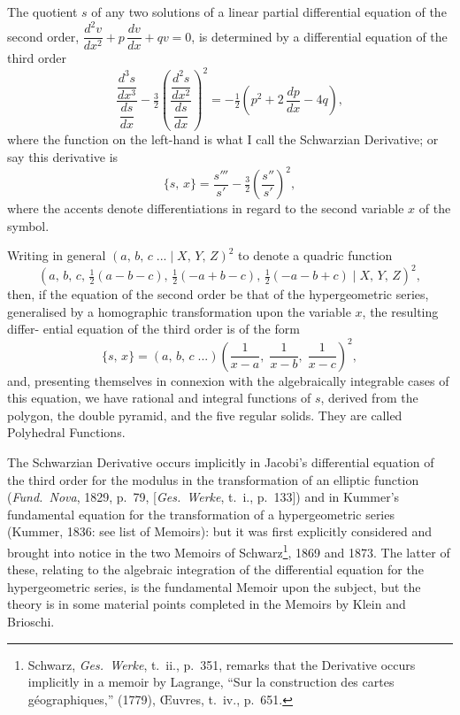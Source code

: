 \documentclass[11pt]{article}
\begin{document}
\bigskip

The quotient $s$ of any two solutions of a linear partial differential equation of
the second order, $\dfrac{d^2 v}{dx^2} + p\,\dfrac{dv}{dx} + qv = 0$, is determined by a differential equation of the
third order
\[
   \frac{\dfrac{d^3 s}{dx^3}}{\dfrac{ds}{dx}} - \tfrac{3}{2}\left(\frac{\dfrac{d^2 s}{dx^2}}{\dfrac{ds}{dx}}\right)^2
   = -\tfrac{1}{2}\!\left(p^2 + 2\,\frac{dp}{dx} - 4q\right),
\]
where the function on the left-hand is what I call the Schwarzian Derivative; or
say this derivative is
\[
   \{s,\, x\} = \frac{s'''}{s'} - \tfrac{3}{2}\!\left(\frac{s''}{s'}\right)^2,
\]
where the accents denote differentiations in regard to the second variable $x$ of the
symbol.

Writing in general $(a,\, b,\, c\;.{}.\!. \mid X,\, Y,\, Z)^2$ to denote a quadric function
\[
   (a,\, b,\, c,\, \tfrac{1}{2}(a - b - c),\, \tfrac{1}{2}(-a + b - c),\, \tfrac{1}{2}(-a - b + c) \mid X,\, Y,\, Z)^2,
\]
then, if the equation of the second order be that of the hypergeometric series,
generalised by a homographic transformation upon the variable $x$, the resulting differ-
ential equation of the third order is of the form
\[
   \{s,\, x\} = (a,\, b,\, c\;.{}.\!.) \left(\frac{1}{x - a},\; \frac{1}{x - b},\; \frac{1}{x - c}\right)^{\!2}\!,
\]
and, presenting themselves in connexion with the algebraically integrable cases of this
equation, we have rational and integral functions of $s$, derived from the polygon, the
double pyramid, and the five regular solids. They are called Polyhedral Functions.

The Schwarzian Derivative occurs implicitly in Jacobi's differential equation of the
third order for the modulus in the transformation of an elliptic function (\textit{Fund.\ Nova},
1829, p.\ 79, [\textit{Ges.\ Werke}, t.\ i., p.\ 133]) and in Kummer's fundamental equation for the
transformation of a hypergeometric series (Kummer, 1836: see list of Memoirs): but it
was first explicitly considered and brought into notice in the two Memoirs of Schwarz\footnote{Schwarz, \textit{Ges.\ Werke}, t.\ ii., p.\ 351, remarks that the Derivative occurs implicitly in a memoir by Lagrange, ``Sur la construction des cartes g\'eographiques,'' (1779), \OE{}uvres, t.\ iv., p.\ 651.},
1869 and 1873. The latter of these, relating to the algebraic integration of the
differential equation for the hypergeometric series, is the fundamental Memoir upon the
subject, but the theory is in some material points completed in the Memoirs by Klein
and Brioschi.
\end{document}
